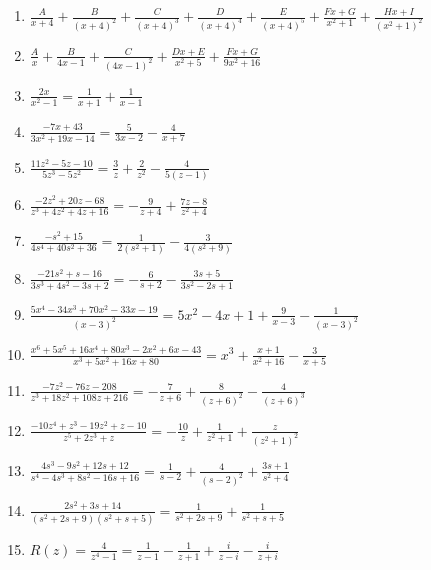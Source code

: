 \documentclass{ximera}
\begin{document}
\begin{enumerate}
\setcounter{enumi}{\value{HW}}

\item $\frac{A}{x + 4} + \frac{B}{(x + 4)^{2}} + \frac{C}{(x + 4)^{3}} + \frac{D}{(x + 4)^{4}} + \frac{E}{(x + 4)^{5}} + \frac{Fx + G}{x^{2} + 1} + \frac{Hx + I}{(x^{2} + 1)^{2}}$
\item $\frac{A}{x} + \frac{B}{4x - 1} + \frac{C}{(4x - 1)^{2}} + \frac{Dx + E}{x^{2} + 5} + \frac{Fx + G}{9x^{2} + 16}$


\item $\frac{2x}{x^{2} - 1} = \frac{1}{x + 1} + \frac{1}{x - 1}$
\item $\frac{-7x + 43}{3x^{2} + 19x - 14}= \frac{5}{3x - 2} - \frac{4}{x + 7}$


\item $\frac{11z^{2} - 5z - 10}{5z^{3} - 5z^{2}} = \frac{3}{z} + \frac{2}{z^{2}} - \frac{4}{5(z - 1)}$
\item $\frac{-2z^{2} + 20z - 68}{z^{3} + 4z^{2} + 4z + 16} = -\frac{9}{z + 4} + \frac{7z - 8}{z^{2} + 4}$


\item $\frac{-s^{2} + 15}{4s^{4} + 40s^{2} + 36} = \frac{1}{2(s^{2} + 1)} - \frac{3}{4(s^{2} + 9)}$
\item $\frac{-21s^{2} + s - 16}{3s^{3} + 4s^{2} - 3s + 2} = -\frac{6}{s + 2} - \frac{3s + 5}{3s^{2} - 2s + 1}$


\item $\frac{5x^{4} - 34x^{3} + 70x^{2} - 33x - 19}{(x - 3)^{2}} = 5x^{2} - 4x + 1 + \frac{9}{x - 3} - \frac{1}{(x - 3)^{2}}$
\item $\frac{x^{6} + 5x^{5} + 16x^{4} + 80x^{3} - 2x^{2} + 6x - 43}{x^{3} + 5x^{2} + 16x + 80} = x^{3} + \frac{x + 1}{x^{2} + 16} - \frac{3}{x + 5}$


\item $\frac{-7z^{2} - 76z - 208}{z^{3} + 18z^{2} + 108z + 216} = -\frac{7}{z + 6} + \frac{8}{(z + 6)^{2}} - \frac{4}{(z + 6)^{3}}$
\item $\frac{-10z^{4} + z^{3} - 19z^{2} + z - 10}{z^{5} + 2z^{3} + z} = -\frac{10}{z} + \frac{1}{z^{2} + 1} + \frac{z}{(z^{2} + 1)^{2}}$


\item $\frac{4s^{3} - 9s^{2} + 12s + 12}{s^{4} - 4s^{3} + 8s^{2} - 16s + 16}= \frac{1}{s - 2} + \frac{4}{(s - 2)^{2}} + \frac{3s + 1}{s^{2} + 4}$
\item $\frac{2s^{2} + 3s + 14}{(s^{2} + 2s + 9)(s^{2} + s + 5)} = \frac{1}{s^{2} + 2s + 9} + \frac{1}{s^{2} + s + 5}$

\item $R(z) = \frac{4}{z^4-1} = \frac{1}{z-1} - \frac{1}{z+1} + \frac{i}{z-i} -  \frac{i}{z+i} $

\end{enumerate}
\end{document}
